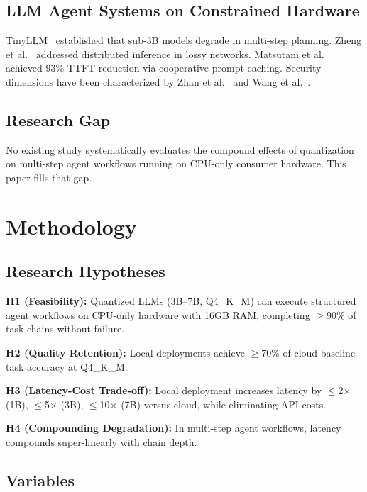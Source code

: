 \documentclass[conference]{IEEEtran}
\begin{document}
\subsection{LLM Agent Systems on Constrained Hardware}

TinyLLM~\cite{chen2025tinyllm} established that sub-3B models degrade in multi-step planning. Zheng et al.~\cite{zheng2026halo} addressed distributed inference in lossy networks. Matsutani et al.~\cite{matsutani2026distributed} achieved 93\% TTFT reduction via cooperative prompt caching. Security dimensions have been characterized by Zhan et al.~\cite{zhan2026edgesecurity} and Wang et al.~\cite{wang2026openclaw}.

\subsection{Research Gap}

No existing study systematically evaluates the compound effects of quantization on multi-step agent workflows running on CPU-only consumer hardware. This paper fills that gap.

\section{Methodology}

\subsection{Research Hypotheses}

\textbf{H1 (Feasibility):} Quantized LLMs (3B--7B, Q4\_K\_M) can execute structured agent workflows on CPU-only hardware with 16GB RAM, completing $\geq$90\% of task chains without failure.

\textbf{H2 (Quality Retention):} Local deployments achieve $\geq$70\% of cloud-baseline task accuracy at Q4\_K\_M.

\textbf{H3 (Latency-Cost Trade-off):} Local deployment increases latency by $\leq$2$\times$ (1B), $\leq$5$\times$ (3B), $\leq$10$\times$ (7B) versus cloud, while eliminating API costs.

\textbf{H4 (Compounding Degradation):} In multi-step agent workflows, latency compounds super-linearly with chain depth.

\subsection{Variables}
\end{document}
